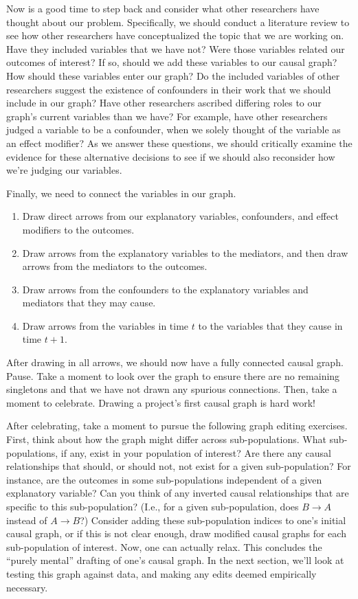 Now is a good time to step back and consider what other researchers have thought about our problem.
Specifically, we should conduct a literature review to see how other researchers have conceptualized the topic that we are working on.
Have they included variables that we have not?
Were those variables related our outcomes of interest?
If so, should we add these variables to our causal graph? How should these variables enter our graph?
Do the included variables of other researchers suggest the existence of confounders in their work that we should include in our graph?
Have other researchers ascribed differing roles to our graph's current variables than we have?
For example, have other researchers judged a variable to be a confounder, when we solely thought of the variable as an effect modifier?
As we answer these questions, we should critically examine the evidence for these alternative decisions to see if we should also reconsider how we're judging our variables.

Finally, we need to connect the variables in our graph.
\begin{enumerate}
   \item Draw direct arrows from our explanatory variables, confounders, and effect modifiers to the outcomes.
   \item Draw arrows from the explanatory variables to the mediators, and then draw arrows from the mediators to the outcomes.
   \item Draw arrows from the confounders to the explanatory variables and mediators that they may cause.
   \item Draw arrows from the variables in time $t$ to the variables that they cause in time $t+1$.
\end{enumerate}
After drawing in all arrows, we should now have a fully connected causal graph.
Pause.
Take a moment to look over the graph to ensure there are no remaining singletons and that we have not drawn any spurious connections.
Then, take a moment to celebrate.
Drawing a project's first causal graph is hard work!

After celebrating, take a moment to pursue the following graph editing exercises.
First, think about how the graph might differ across sub-populations.
What sub-populations, if any, exist in your population of interest?
Are there any causal relationships that should, or should not, not exist for a given sub-population?
For instance, are the outcomes in some sub-populations independent of a given explanatory variable?
Can you think of any inverted causal relationships that are specific to this sub-population?
(I.e., for a given sub-population, does $B \rightarrow A$ instead of $A \rightarrow B$?)
Consider adding these sub-population indices to one's initial causal graph, or if this is not clear enough, draw modified causal graphs for each sub-population of interest.
Now, one can actually relax.
This concludes the ``purely mental'' drafting of one's causal graph.
In the next section, we'll look at testing this graph against data, and making any edits deemed empirically necessary.
